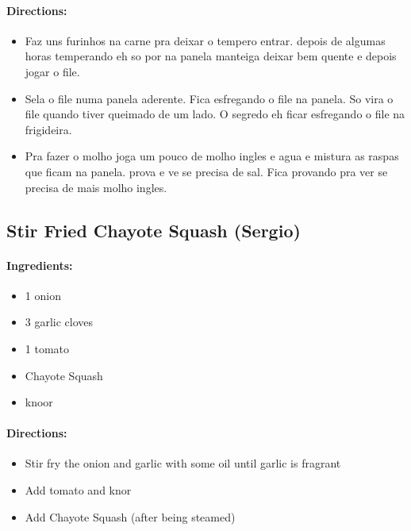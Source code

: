 \documentclass{article}
\begin{document}
\paragraph{Directions:}
\begin{itemize}
    \item Faz uns furinhos na carne pra deixar o tempero entrar. depois de algumas horas temperando eh so por na panela manteiga deixar bem quente e depois jogar o file.
    \item Sela o file numa panela aderente. Fica esfregando o file na panela. So vira o file quando tiver queimado de um lado. O segredo eh ficar esfregando o file na frigideira.
    \item Pra fazer o molho joga um pouco de molho ingles e agua e mistura as raspas que ficam na panela. prova e ve se precisa de sal. Fica provando pra ver se precisa de mais molho ingles.
\end{itemize}

\subsection{Stir Fried Chayote Squash (Sergio)}

\paragraph{Ingredients:}
\begin{itemize}
    \item 1 onion
    \item 3 garlic cloves
    \item 1 tomato
    \item Chayote Squash
    \item knoor
\end{itemize}

\paragraph{Directions:}
\begin{itemize}
    \item Stir fry the onion and garlic with some oil until garlic is fragrant
    \item Add tomato and knor
    \item Add Chayote Squash (after being steamed)
\end{itemize}
\end{document}

